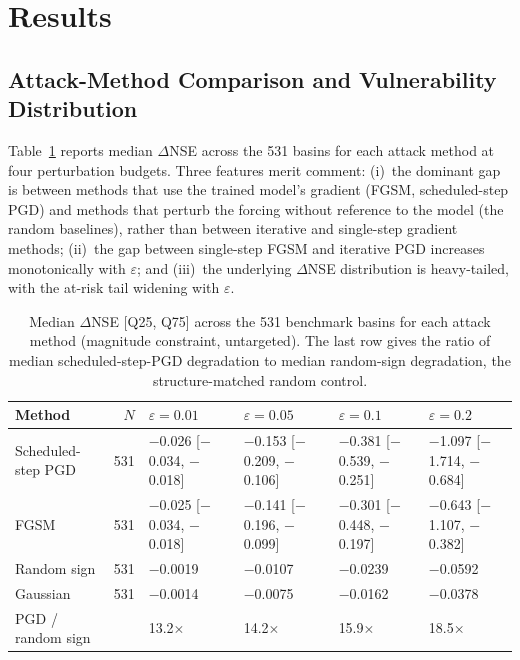\documentclass[final]{agujournal2019}
\begin{document}
\section{Results}

\subsection{Attack-Method Comparison and Vulnerability Distribution}

Table~\ref{tab:attack} reports median $\Delta$NSE across the 531 basins for each attack method at four perturbation budgets. Three features merit comment: (i)~the dominant gap is between methods that use the trained model's gradient (FGSM, scheduled-step PGD) and methods that perturb the forcing without reference to the model (the random baselines), rather than between iterative and single-step gradient methods; (ii)~the gap between single-step FGSM and iterative PGD increases monotonically with $\varepsilon$; and (iii)~the underlying $\Delta$NSE distribution is heavy-tailed, with the at-risk tail widening with $\varepsilon$.

\begin{table}[ht]
\caption{Median $\Delta$NSE [Q25, Q75] across the 531 benchmark basins for each attack method (magnitude constraint, untargeted). The last row gives the ratio of median scheduled-step-PGD degradation to median random-sign degradation, the structure-matched random control.}
\label{tab:attack}
\centering
\small
\setlength{\tabcolsep}{4pt}
\begin{tabular}{lrllll}
\toprule
Method & $N$ & $\varepsilon{=}0.01$ & $\varepsilon{=}0.05$ & $\varepsilon{=}0.1$ & $\varepsilon{=}0.2$ \\
\midrule
Scheduled-step PGD & 531 & $-$0.026 [$-$0.034, $-$0.018] & $-$0.153 [$-$0.209, $-$0.106] & $-$0.381 [$-$0.539, $-$0.251] & $-$1.097 [$-$1.714, $-$0.684] \\
FGSM & 531 & $-$0.025 [$-$0.034, $-$0.018] & $-$0.141 [$-$0.196, $-$0.099] & $-$0.301 [$-$0.448, $-$0.197] & $-$0.643 [$-$1.107, $-$0.382] \\
Random sign & 531 & $-$0.0019 & $-$0.0107 & $-$0.0239 & $-$0.0592 \\
Gaussian & 531 & $-$0.0014 & $-$0.0075 & $-$0.0162 & $-$0.0378 \\
\midrule
PGD / random sign & & 13.2$\times$ & 14.2$\times$ & 15.9$\times$ & 18.5$\times$ \\
\bottomrule
\end{tabular}
\end{table}
\end{document}
